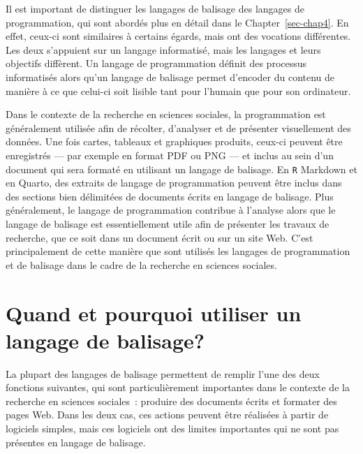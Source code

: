\documentclass[
  letterpaper,
]{scrbook}
\begin{document}
Il est important de distinguer les langages de balisage des langages de
programmation, qui sont abordés plus en détail dans le
Chapter~\ref{sec-chap4}. En effet, ceux-ci sont similaires à certains
égards, mais ont des vocations différentes. Les deux s'appuient sur un
langage informatisé, mais les langages et leurs objectifs diffèrent. Un
langage de programmation définit des processus informatisés alors qu'un
langage de balisage permet d'encoder du contenu de manière à ce que
celui-ci soit lisible tant pour l'humain que pour son ordinateur.

Dans le contexte de la recherche en sciences sociales, la programmation
est généralement utilisée afin de récolter, d'analyser et de présenter
visuellement des données. Une fois cartes, tableaux et graphiques
produits, ceux-ci peuvent être enregistrés --- par exemple en format PDF
ou PNG --- et inclus au sein d'un document qui sera formaté en utilisant
un langage de balisage. En \texttt{R} Markdown et en Quarto, des
extraits de langage de programmation peuvent être inclus dans des
sections bien délimitées de documents écrits en langage de balisage.
Plus généralement, le langage de programmation contribue à l'analyse
alors que le langage de balisage est essentiellement utile afin de
présenter les travaux de recherche, que ce soit dans un document écrit
ou sur un site Web. C'est principalement de cette manière que sont
utilisés les langages de programmation et de balisage dans le cadre de
la recherche en sciences sociales.

\hypertarget{quand-et-pourquoi-utiliser-un-langage-de-balisage}{%
\section{Quand et pourquoi utiliser un langage de
balisage?}\label{quand-et-pourquoi-utiliser-un-langage-de-balisage}}

La plupart des langages de balisage permettent de remplir l'une des deux
fonctions suivantes, qui sont particulièrement importantes dans le
contexte de la recherche en sciences sociales~: produire des documents
écrits et formater des pages Web. Dans les deux cas, ces actions peuvent
être réalisées à partir de logiciels simples, mais ces logiciels ont des
limites importantes qui ne sont pas présentes en langage de balisage.
\end{document}
